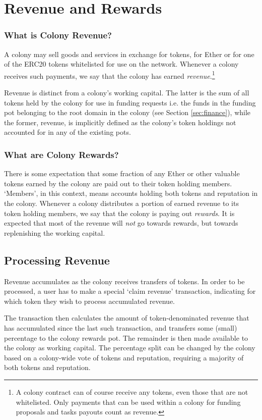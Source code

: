 \section{Revenue and Rewards}\label{sec:revenue}

\subsubsection*{What is Colony Revenue?}
A colony may sell goods and services in exchange for tokens, for Ether or for one of the  ERC20 tokens whitelisted for use on the network. Whenever a colony receives such payments, we say that the colony has earned \emph{revenue}.\footnote{A colony contract can of course receive any tokens, even those that are not whitelisted. Only payments that can be used within a colony for funding proposals and tasks payouts count as revenue.}

Revenue is distinct from a colony's working capital. The latter is the sum of all tokens held by the colony for use in funding requests i.e. the funds in the funding pot belonging to the root domain in the colony (see Section \ref{sec:finance}), while the former, revenue, is implicitly defined as the colony's token holdings not accounted for in any of the existing pots.

\subsubsection*{What are Colony Rewards?}
There is some expectation that some fraction of any Ether or other valuable tokens earned by the colony are paid out to their token holding members. `Members', in this context, means accounts holding both tokens and reputation in the colony. Whenever a colony distributes a portion of earned revenue to its token holding members, we say that the colony is paying out \emph{rewards}. It is expected that most of the revenue will \emph{not} go towards rewards, but towards replenishing the working capital.

\subsection{Processing Revenue}
Revenue accumulates as the colony receives transfers of tokens. In order to be processed, a user has to make a special `claim revenue' transaction, indicating for which token they wish to process accumulated revenue.

The transaction then calculates the amount of token-denominated revenue that has accumulated since the last such transaction, and transfers some (small) percentage to the colony rewards pot. The remainder is then made available to the colony as working capital. The percentage split can be changed by the colony based on a colony-wide vote of tokens and reputation, requiring a majority of both tokens and reputation.

